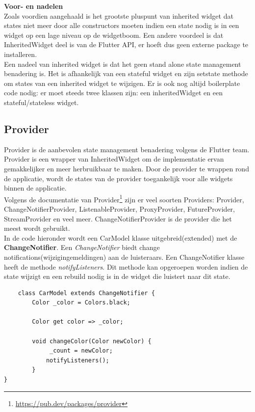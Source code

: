 \textbf{Voor- en nadelen}
\\
Zoals voordien aangehaald is het grootste pluspunt van inherited widget dat states niet meer door alle constructors moeten indien een state nodig is in een widget op een lage niveau op de widgetboom. 
Een andere voordeel is dat InheritedWidget deel is van de Flutter API, er hoeft dus geen externe package te installeren. 
\\
Een nadeel van inherited widget is dat het geen stand alone state management benadering is. Het is afhankelijk 
van een stateful widget en zijn setstate methode om states van een inherited widget te wijzigen. Er is ook nog altijd boilerplate code nodig: er moet steeds twee klassen zijn: een inheritedWidget en een stateful/stateless widget.




\subsection{{Provider}}%
\label{sec:Provider}
Provider is de aanbevolen state management benadering volgens de Flutter team. Provider is een wrapper van InheritedWidget om de implementatie ervan gemakkelijker en meer herbruikbaar te maken.
Door de provider te wrappen rond de applicatie, wordt de states van de provider toegankelijk voor alle widgets binnen de applicatie. 
\\
Volgens de documentatie van Provider\footnote{\url{https://pub.dev/packages/provider}} zijn er veel soorten Providers: Provider, ChangeNotifierProvider, ListenableProvider, ProxyProvider, FutureProvider, StreamProvider en veel meer. ChangeNotifierProvider is de provider
die het meest wordt gebruikt.
\\
In de code hieronder wordt een CarModel klasse uitgebreid(extended) met de \textbf{ChangeNotifier}. Een \textit{ChangeNotifier} biedt change notifications(wijzigingemeldingen) aan de luisteraars. Een ChangeNotifier klasse
heeft de methode \textit{notifyListeners}. Dit methode kan opgeroepen worden indien de state wijzigt en een rebuild nodig is in de widget die luistert naar dit state. 
\begin{verbatim}
    class CarModel extends ChangeNotifier {
        Color _color = Colors.black;

        Color get color => _color;

        void changeColor(Color newColor) {
             _count = newColor;
            notifyListeners();
        }
}
\end{verbatim}

